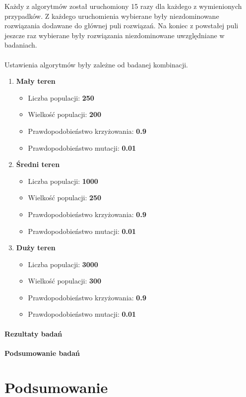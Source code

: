 \documentclass[twoside]{iisthesis}
\begin{document}
Każdy z algorytmów został uruchomiony 15 razy dla każdego z wymienionych przypadków. Z każdego uruchomienia wybierane były niezdominowane rozwiązania dodawane do głównej puli rozwiązań. Na koniec z powstałej puli jeszcze raz wybierane były rozwiązania niezdominowane uwzględniane w badaniach.\\\\
Ustawienia algorytmów były zależne od badanej kombinacji.
\begin{enumerate}
	\item \textbf{Mały teren}
	\begin{itemize}
		\item Liczba populacji: \textbf{250}
		\item Wielkość populacji: \textbf{200}
		\item Prawdopodobieństwo krzyżowania: \textbf{0.9}
		\item Prawdopodobieństwo mutacji: \textbf{0.01}
	\end{itemize}
	\item \textbf{Średni teren}
		\begin{itemize}
		\item Liczba populacji: \textbf{1000}
		\item Wielkość populacji: \textbf{250}
		\item Prawdopodobieństwo krzyżowania: \textbf{0.9}
		\item Prawdopodobieństwo mutacji: \textbf{0.01}
	\end{itemize}
	\item \textbf{Duży teren}
		\begin{itemize}
		\item Liczba populacji: \textbf{3000}
		\item Wielkość populacji: \textbf{300}
		\item Prawdopodobieństwo krzyżowania: \textbf{0.9}
		\item Prawdopodobieństwo mutacji: \textbf{0.01}
	\end{itemize}
\end{enumerate}
\subsubsection{Rezultaty badań}
\subsubsection{Podsumowanie badań}

\chapter{Podsumowanie}
\end{document}
